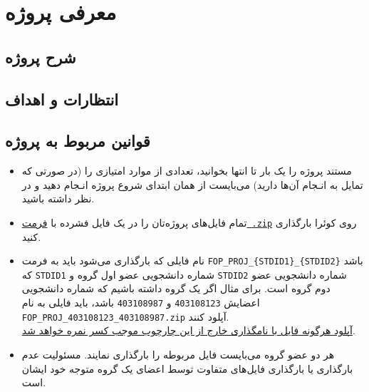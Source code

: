 \chapter{معرفی پروژه}
\section{شرح پروژه}

\section{انتظارات و اهداف}

\section{قوانین مربوط به پروژه}

\begin{itemize}
    \item {
        مستند پروژه را یک بار تا انتها بخوانید، تعدادی از موارد امتیازی را (در صورتی که تمایل به انـجام آن‌ها دارید) می‌بایست از همان ابتدای شروع پروژه انـجام دهید و در نظر داشته باشید.
    }
    \item {
        تمام فایل‌های پروژه‌تان را در یک فایل فشرده با \underline{فرمت \,\texttt{.zip}}  روی کوئرا بارگذاری کنید.
    }
    \item {
        نام فایلی که بارگذاری می‌شود باید به فرمت \texttt{FOP\_PROJ\_\{STDID1\}\_\{STDID2\}} باشد که \texttt{STDID1} شماره دانشجویی عضو اول گروه و \texttt{STDID2} شماره دانشجویی عضو دوم گروه است.
        برای مثال اگر یک گروه داشته باشیم که شماره دانشجویی اعضایش \texttt{403108123} و \texttt{403108987} باشد،
        باید فایلی به نام \texttt{FOP\_PROJ\_403108123\_403108987.zip} آپلود کنند.\\
        {\large \underline{آپلود هرگونه فایل با نامگذاری خارج از این چارچوب موجب کسر نمره خواهد شد}.}
    }
    \item {
        هر دو عضو گروه می‌بایست فایل مربوطه را بارگذاری نمایند. مسئولیت عدم بارگذاری یا بارگذاری فایل‌های متفاوت توسط اعضای یک گروه متوجه خود ایشان است.
    }
\end{itemize}